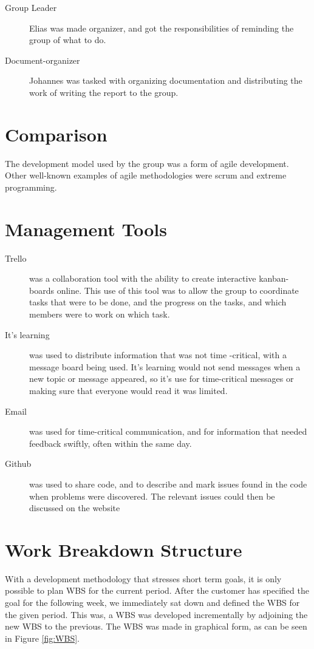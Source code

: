 \begin{description}

\item[Group Leader] Elias was made organizer, and got the responsibilities of reminding the group of what to do.
\item[Document-organizer] Johannes was tasked with organizing documentation and distributing the work of writing the report to the group. 
\end{description}

\section{Comparison}
The development model used by the group was a form of agile development. Other well-known examples of agile methodologies were scrum and extreme programming. 

\section{Management Tools}
 
\begin{description}

\item[Trello]  \label{def:trello} was a collaboration tool with the ability to create interactive kanban-boards online. This use of this tool was to allow the group to coordinate tasks that were to be done, and the progress on the tasks, and which members were to work on which task. 
\item[It's learning] was used to distribute information that was not time -critical, with a message board being used. It's learning would not send messages when a new topic or message appeared, so it's use for time-critical messages or making sure that everyone would read it was limited. 
\item[Email] was used for time-critical communication, and for information that needed feedback swiftly, often within the same day.
\item[Github] \label{def:github} was used to share code, and to describe and mark issues found in the code when problems were discovered. The relevant issues could then be discussed on the website
\end{description}
\section{Work Breakdown Structure}
With a development methodology that stresses short term goals, it is only possible to plan WBS for the current period. After the customer has specified the goal for the following week, we immediately sat down and defined the WBS for the given period. This was, a WBS was developed incrementally by adjoining the new WBS to the previous. The WBS was made in graphical form, as can be seen in Figure \ref{fig:WBS}.

